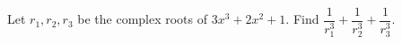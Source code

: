 Let $r_1,r_2,r_3$ be the complex roots of $3x^3+2x^2+1$. Find $\dfrac{1}{r_1^3}+\dfrac{1}{r_2^3}+\dfrac{1}{r_3^3}$.
